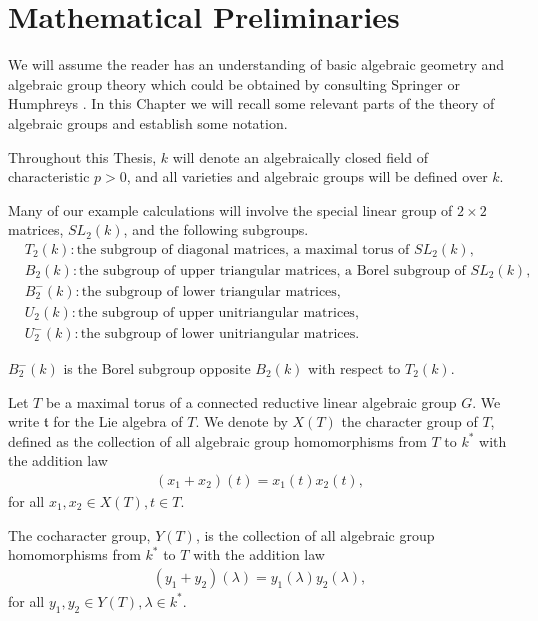 
\chapter{Mathematical Preliminaries}
\label{Chapter2}

We will assume the reader has an understanding of basic algebraic geometry and algebraic group theory which could be obtained by consulting Springer \cite{springer2008linear} or Humphreys \cite{humphreys1975linear}. In this Chapter we will recall some relevant parts of the theory of algebraic groups and establish some notation.

Throughout this Thesis, $k$ will denote an algebraically closed field of characteristic $p>0$, and all varieties and algebraic groups will be defined over $k$.

Many of our example calculations will involve the special linear group of $2\times 2$ matrices, $SL_2(k)$, and the following subgroups.
\begin{align*}
	&T_2(k): \textrm{the subgroup of diagonal matrices, a maximal torus of }SL_2(k),\\
	&B_2(k): \textrm{the subgroup of upper triangular matrices, a Borel subgroup of }SL_2(k),\\
	&B^-_2(k): \textrm{the subgroup of lower triangular matrices},\\
	&U_2(k): \textrm{the subgroup of upper unitriangular matrices},\\
	&U^-_2(k): \textrm{the subgroup of lower unitriangular matrices}.
\end{align*}

$B_2^-(k)$ is the Borel subgroup opposite $B_2(k)$ with respect to $T_2(k)$.

Let $T$ be a maximal torus of a connected reductive linear algebraic group $G$. We write $\mathfrak{t}$ for the Lie algebra of $T$. We denote by $X(T)$ the character group of $T$, defined as the collection of all algebraic group homomorphisms from $T$ to $k^*$ with the addition law
\begin{align*}
	(x_1 + x_2)(t) = x_1(t)x_2(t),
\end{align*}
for all $x_1, x_2\in X(T), t\in T$.

The cocharacter group, $Y(T)$, is the collection of all algebraic group homomorphisms from $k^*$ to $T$ with the addition law
\begin{align*}
	(y_1 + y_2)(\lambda) = y_1(\lambda)y_2(\lambda),
\end{align*}
for all $y_1, y_2\in Y(T), \lambda \in k^*$.

